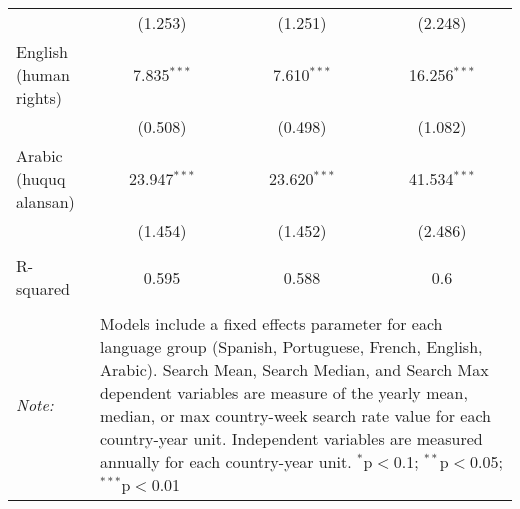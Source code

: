 \begin{table}[!htbp]
\begin{tabular}{@{\extracolsep{5pt}}lccc}
  & (1.253) & (1.251) & (2.248) \\ 
  English (human rights) & 7.835$^{***}$ & 7.610$^{***}$ & 16.256$^{***}$ \\ 
  & (0.508) & (0.498) & (1.082) \\ 
  Arabic (huquq alansan) & 23.947$^{***}$ & 23.620$^{***}$ & 41.534$^{***}$ \\ 
  & (1.454) & (1.452) & (2.486) \\ 
 \hline \\[-1.8ex] 
R-squared  & 0.595 & 0.588 & 0.6 \\ 
\hline 
\hline \\[-1.8ex] 
\textit{Note:}  & \multicolumn{3}{l}{\parbox[t]{8cm}{Models include a fixed effects parameter for each language group (Spanish, Portuguese, French, English, Arabic). Search Mean, Search Median, and Search Max dependent variables are measure of the yearly mean, median, or max country-week search rate value for each country-year unit. Independent variables are measured annually for each country-year unit. $^{*}$p$<$0.1; $^{**}$p$<$0.05; $^{***}$p$<$0.01}} \\ 
\end{tabular} 
\end{table} 
